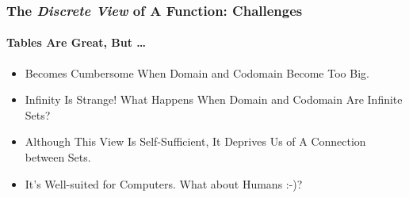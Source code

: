 \begin{frame}
\frametitle{The \textit{Discrete View} of A Function: Challenges}
\framesubtitle{Tables Are Great, But \dots}
\label{slide:discrete-view-challenges}
\begin{itemize}
\item Becomes Cumbersome When \alert{Domain and Codomain Become Too Big}.
\pause
\item \alert{Infinity} Is Strange! What Happens When Domain and Codomain Are \alert {Infinite Sets}?
\pause
\item Although This View Is Self-Sufficient, It Deprives Us of A \alert{Connection between Sets}.
\pause
\item It's Well-suited for Computers. What about \alert{Humans :-)}?
\end{itemize}
\end{frame}
